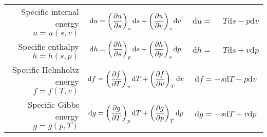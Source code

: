 \begin{tabularx}{420pt}{rcc}
\toprule
Specific internal energy $u = u(s,v)$ & $\mathrm{d}u = 
  \left( \dfrac{\partial u}{\partial s} \right)_{v} \mathrm{d}s
+ \left( \dfrac{\partial u}{\partial v} \right)_{s} \mathrm{d}v
$ & $\mathrm{d}u =
\phantom{+} T \mathrm{d}s
- p \mathrm{d}v$ \\[15pt]
Specific enthalpy $h  = h(s,p)$ & $\mathrm{d}h = 
  \left( \dfrac{\partial h}{\partial s} \right)_{p} \mathrm{d}s
+ \left( \dfrac{\partial h}{\partial p} \right)_{s} \mathrm{d}p
$ & $\mathrm{d}h =
\phantom{+} T \mathrm{d}s
+ v \mathrm{d}p$ \\[15pt]
Specific Helmholtz energy $f = f(T,v)$ & $\mathrm{d}f = 
  \left( \dfrac{\partial f}{\partial T} \right)_{v} \mathrm{d}T
+ \left( \dfrac{\partial f}{\partial v} \right)_{T} \mathrm{d}v
$ & $\mathrm{d}f =
- s \mathrm{d}T
- p \mathrm{d}v$ \\[15pt]
Specific Gibbs energy $g = g(p,T)$ & $\mathrm{d}g = 
  \left( \dfrac{\partial g}{\partial T} \right)_{p} \mathrm{d}T
+ \left( \dfrac{\partial g}{\partial p} \right)_{T} \mathrm{d}p
$ & $\mathrm{d}g =
-s\mathrm{d}T
+v\mathrm{d}p$ \\
\bottomrule
\end{tabularx}%
